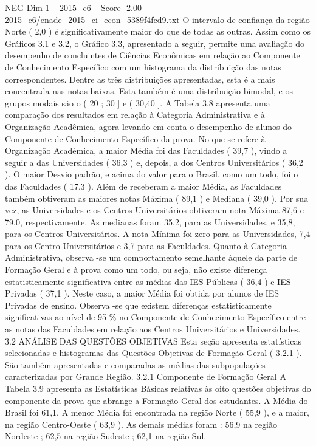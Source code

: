 \begin{textsample}{NEG Dim 1 – 2015\_c6 – Score -2.00 – 2015\_c6/enade\_2015\_ci\_econ\_5389f4fcd9.txt}
O intervalo de confiança da região Norte ( 2,0 ) é significativamente maior do que de todas as outras.
Assim como os Gráficos 3.1 e 3.2, o Gráfico 3.3, apresentado a seguir, permite uma avaliação do desempenho de concluintes de Ciências Econômicas em relação ao Componente de Conhecimento Específico com um histograma da distribuição das notas correspondentes.
Dentre as três distribuições apresentadas, esta é a mais concentrada nas notas baixas.
Esta também é uma distribuição bimodal, e os grupos modais são o ( 20 ; 30 ] e ( 30,40 ].
A Tabela 3.8 apresenta uma comparação dos resultados em relação à Categoria Administrativa e à Organização Acadêmica, agora levando em conta o desempenho de alunos do Componente de Conhecimento Específico da prova.
No que se refere à Organização Acadêmica, a maior Média foi das Faculdades ( 39,7 ), vindo a seguir a das Universidades ( 36,3 ) e, depois, a dos Centros Universitários ( 36,2 ).
O maior Desvio padrão, e acima do valor para o Brasil, como um todo, foi o das Faculdades ( 17,3 ).
Além de receberam a maior Média, as Faculdades também obtiveram as maiores notas Máxima ( 89,1 ) e Mediana ( 39,0 ).
Por sua vez, as Universidades e os Centros Universitários obtiveram nota Máxima 87,6 e 79,0, respectivamente.
As medianas foram 35,2, para as Universidades, e 35,8, para os Centros Universitários.
A nota Mínima foi zero para as Universidades, 7,4 para os Centro Universitários e 3,7 para as Faculdades.
Quanto à Categoria Administrativa, observa -se um comportamento semelhante àquele da parte de Formação Geral e à prova como um todo, ou seja, não existe diferença estatisticamente significativa entre as médias das IES Públicas ( 36,4 ) e IES Privadas ( 37,1 ).
Neste caso, a maior Média foi obtida por alunos de IES Privadas de ensino.
Observa -se que existem diferenças estatisticamente significativas ao nível de 95 \% no Componente de Conhecimento Específico entre as notas das Faculdades em relação aos Centros Universitários e Universidades. 3.2 ANÁLISE DAS QUESTÕES OBJETIVAS Esta seção apresenta estatísticas selecionadas e histogramas das Questões Objetivas de Formação Geral ( 3.2.1 ).
São também apresentadas e comparadas as médias das subpopulações caracterizadas por Grande Região. 3.2.1 Componente de Formação Geral A Tabela 3.9 apresenta as Estatísticas Básicas relativas às oito questões objetivas do componente da prova que abrange a Formação Geral dos estudantes.
A Média do Brasil foi 61,1.
A menor Média foi encontrada na região Norte ( 55,9 ), e a maior, na região Centro-Oeste ( 63,9 ).
As demais médias foram : 56,9 na região Nordeste ; 62,5 na região Sudeste ; 62,1 na região Sul.

\end{textsample}

